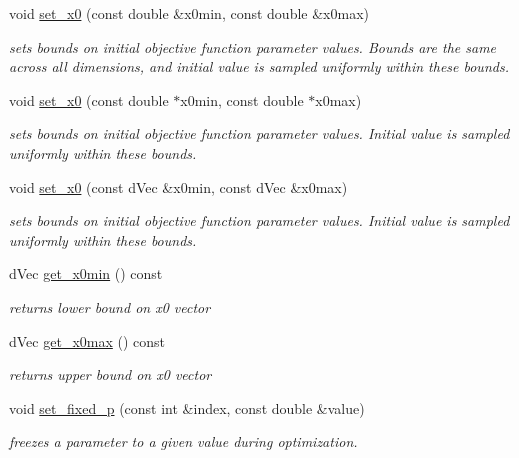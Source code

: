\begin{DoxyCompactItemize}
void \hyperlink{classlibcmaes_1_1Parameters_a2db4deff995719566b86bfc0c2df4e91}{set\-\_\-x0} (const double \&x0min, const double \&x0max)
\begin{DoxyCompactList}\small\item\em sets bounds on initial objective function parameter values. Bounds are the same across all dimensions, and initial value is sampled uniformly within these bounds. \end{DoxyCompactList}\item 
void \hyperlink{classlibcmaes_1_1Parameters_addda8e395450878e87538df7b4032cbe}{set\-\_\-x0} (const double $\ast$x0min, const double $\ast$x0max)
\begin{DoxyCompactList}\small\item\em sets bounds on initial objective function parameter values. Initial value is sampled uniformly within these bounds. \end{DoxyCompactList}\item 
void \hyperlink{classlibcmaes_1_1Parameters_acc94e18faebb18dcaa0712a296e76949}{set\-\_\-x0} (const d\-Vec \&x0min, const d\-Vec \&x0max)
\begin{DoxyCompactList}\small\item\em sets bounds on initial objective function parameter values. Initial value is sampled uniformly within these bounds. \end{DoxyCompactList}\item 
d\-Vec \hyperlink{classlibcmaes_1_1Parameters_a1f7532a4bac9543094e7879baf3d73e1}{get\-\_\-x0min} () const 
\begin{DoxyCompactList}\small\item\em returns lower bound on x0 vector \end{DoxyCompactList}\item 
d\-Vec \hyperlink{classlibcmaes_1_1Parameters_adba08aae48f823c1611466ec86ae3b75}{get\-\_\-x0max} () const 
\begin{DoxyCompactList}\small\item\em returns upper bound on x0 vector \end{DoxyCompactList}\item 
void \hyperlink{classlibcmaes_1_1Parameters_a30236ca44b7de58b160bf2b1170f69b2}{set\-\_\-fixed\-\_\-p} (const int \&index, const double \&value)
\begin{DoxyCompactList}\small\item\em freezes a parameter to a given value during optimization. \end{DoxyCompactList}\item 

\end{DoxyCompactItemize}
